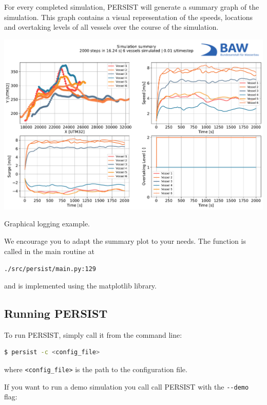 \documentclass[
	a4paper, %
	12pt, %
]{persist}
\begin{document}
For every completed simulation, PERSIST will generate a summary graph of the simulation. This graph contains a visual representation of the speeds, locations and overtaking levels of all vessels over the course of the simulation.
\begin{marginfigure}
	\includegraphics[width=\linewidth]{img/summary.pdf}
	\caption{Graphical logging example.}
	\label{fig:graph}
\end{marginfigure}

We encourage you to adapt the summary plot to your needs. The function is called in the main routine at 

\verb|./src/persist/main.py:129|

and is implemented using the matplotlib library.

\subsection{Running PERSIST}

To run PERSIST, simply call it from the command line:

\begin{lstlisting}[language=bash]
	$ persist -c <config_file>
\end{lstlisting}

where \verb|<config_file>| is the path to the configuration file.

If you want to run a demo simulation you call call PERSIST with the \verb|--demo| flag:
\end{document}
